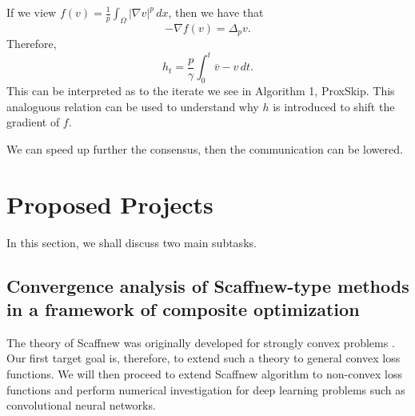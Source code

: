 \begin{itemize}
If we view $f(v) = \frac{1}{p} \int_\Omega |\nabla v|^p \, dx$, then we have that 
\begin{equation}
-\nabla f(v) = \Delta_p v.     
\end{equation}
Therefore, 
\begin{equation}
h_t = \frac{p}{\gamma} \int_0^t \overline{v} - v \, dt.  
\end{equation}
This can be interpreted as to the iterate we see in Algorithm 1, ProxSkip. 
This analoguous relation can be used to understand why $h$ is introduced to shift the gradient of $f$. 
\begin{remark}
We can speed up further the consensus, then the communication can be lowered.
\end{remark}

\section{Proposed Projects} 

In this section, we shall discuss two main subtasks. 



\subsection{Convergence analysis of Scaffnew-type methods in a framework of composite optimization} 

The theory of Scaffnew was originally developed for strongly convex problems \cite{mishchenko2022proxskip}. Our first target goal is, therefore, to extend such a theory to general convex loss functions. We will then proceed to extend Scaffnew algorithm to non-convex loss functions and perform numerical investigation for deep learning problems such as convolutional neural networks. 


\end{itemize}
